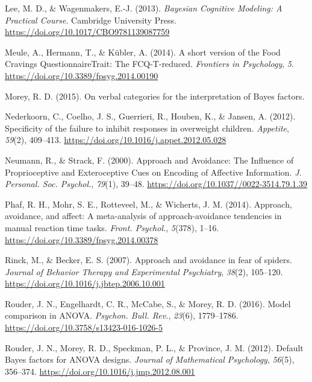 \documentclass[man,floatsintext]{apa6}
\begin{document}
\hypertarget{ref-lee_bayesian_2013}{}
Lee, M. D., \& Wagenmakers, E.-J. (2013). \emph{Bayesian Cognitive
Modeling: A Practical Course}. Cambridge University Press.
\url{https://doi.org/10.1017/CBO9781139087759}

\hypertarget{ref-meule_short_2014}{}
Meule, A., Hermann, T., \& Kübler, A. (2014). A short version of the
Food Cravings QuestionnaireTrait: The FCQ-T-reduced. \emph{Frontiers in
Psychology}, \emph{5}. \url{https://doi.org/10.3389/fpsyg.2014.00190}

\hypertarget{ref-richard_d._morey_verbal_2015}{}
Morey, R. D. (2015). On verbal categories for the interpretation of
Bayes factors.

\hypertarget{ref-nederkoorn_specificity_2012}{}
Nederkoorn, C., Coelho, J. S., Guerrieri, R., Houben, K., \& Jansen, A.
(2012). Specificity of the failure to inhibit responses in overweight
children. \emph{Appetite}, \emph{59}(2), 409--413.
\url{https://doi.org/10.1016/j.appet.2012.05.028}

\hypertarget{ref-neumann_approach_2000}{}
Neumann, R., \& Strack, F. (2000). Approach and Avoidance: The Influence
of Proprioceptive and Exteroceptive Cues on Encoding of Affective
Information. \emph{J. Personal. Soc. Psychol.}, \emph{79}(1), 39--48.
\url{https://doi.org/10.1037//0022-3514.79.1.39}

\hypertarget{ref-phaf_approach_2014}{}
Phaf, R. H., Mohr, S. E., Rotteveel, M., \& Wicherts, J. M. (2014).
Approach, avoidance, and affect: A meta-analysis of approach-avoidance
tendencies in manual reaction time tasks. \emph{Front. Psychol.},
\emph{5}(378), 1--16. \url{https://doi.org/10.3389/fpsyg.2014.00378}

\hypertarget{ref-rinck_approach_2007}{}
Rinck, M., \& Becker, E. S. (2007). Approach and avoidance in fear of
spiders. \emph{Journal of Behavior Therapy and Experimental Psychiatry},
\emph{38}(2), 105--120.
\url{https://doi.org/10.1016/j.jbtep.2006.10.001}

\hypertarget{ref-rouderModelComparisonANOVA2016}{}
Rouder, J. N., Engelhardt, C. R., McCabe, S., \& Morey, R. D. (2016).
Model comparison in ANOVA. \emph{Psychon. Bull. Rev.}, \emph{23}(6),
1779--1786. \url{https://doi.org/10.3758/s13423-016-1026-5}

\hypertarget{ref-rouderDefaultBayesFactors2012}{}
Rouder, J. N., Morey, R. D., Speckman, P. L., \& Province, J. M. (2012).
Default Bayes factors for ANOVA designs. \emph{Journal of Mathematical
Psychology}, \emph{56}(5), 356--374.
\url{https://doi.org/10.1016/j.jmp.2012.08.001}
\end{document}
